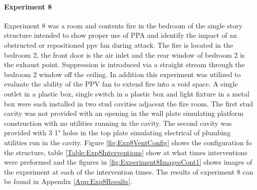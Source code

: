 \documentclass{article}
\begin{document}
\paragraph{Experiment 8}\mbox{}

Experiment 8 was a room and contents fire in the bedroom of the single story structure intended to show proper use of PPA and identify the impact of an obstructed or repositioned ppv fan during attack. The fire is located in the bedroom 2, the front door is the air inlet and the rear window of bedroom 2 is the exhaust point. Suppression is introduced via a straight stream through the bedroom 2 window off the ceiling. In addition this experiment was utilized to evaluate the ability of the PPV fan to extend fire into a void space. A single outlet in a plastic box, single switch in a plastic box and light fixture in a metal box were each installed in two stud cavities adjacent the fire room. The first stud cavity was not provided with an opening in the wall plate simulating platform construction with no utilities running in the cavity. The second cavity was provided with 3 1" holes in the top plate simulating electrical of plumbing utilities run in the cavity. Figure \ref{fig:Exp8VentConfig} shows the configuration fo the structure, table \ref{Table:Exp8Interventions} show at what times interventions were preformed and the figures in \ref{fig:Experiment8ImagesCont1} shows images of the experiment at each of the intervention times. The results of experiment 8 can be found in Appendix \ref{App:Exp8Results}.
\end{document}
